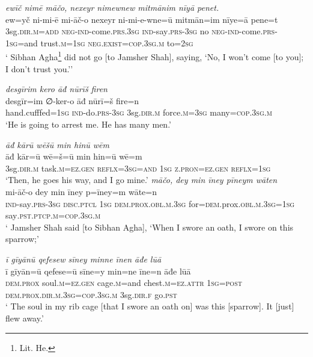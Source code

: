 \ea \label{DP.40}
\textit{ewīč nimē māčo, nexeyr nimewnew mitmānim nīyā penet.} \\ 
\gll ew=yč ni-mi-ē mi-āč-o nexeyr ni-mi-e-wne=ū mitmān=im nīye=ā pene=t \\ 
 3sg\textsc{.dir}\textsc{.m}\textsc{=add} \textsc{neg-}\textsc{ind-}come\textsc{.prs}\textsc{.3sg} \textsc{ind-}say\textsc{.prs}\textsc{-3sg} no \textsc{neg-}\textsc{ind-}come\textsc{.prs}\textsc{-1sg}=and trust\textsc{.m}\textsc{=1sg} \textsc{\textsc{neg.}exist}\textsc{=cop}\textsc{.3sg}\textsc{.m} to\textsc{=\textsc{2sg}} \\ 
\glt ` Sibhan Agha\footnote{Lit. He.} did not go [to Jamsher Shah], saying, ‘No, I won’t come [to you]; I don’t trust you.’'
\z 
 
\ea \label{DP.41}
\textit{desgīrim kero āđ nūrīš firen} \\ 
\gll desgīr=im ∅-ker-o āđ nūrī=š fire=n \\ 
 hand.cufffed\textsc{=1sg} \textsc{ind-}do\textsc{.prs}\textsc{-3sg} 3sg\textsc{.dir}\textsc{.m} force\textsc{.m}\textsc{=3sg} many\textsc{=cop}\textsc{.3sg}\textsc{.m} \\ 
\glt `He is going to arrest me. He has many men.'
\z 
 
\ea \label{DP.45}
\textit{āđ kārū wēšū min hinū wēm} \\ 
\gll āđ kār=ū wē=š=ū min hin=ū wē=m \\ 
 3sg\textsc{.dir}\textsc{.m} task\textsc{.m}\textsc{=ez}\textsc{.gen} \textsc{reflx}\textsc{=3sg}\textsc{=and} \textsc{1sg} \textsc{z.pron}\textsc{=ez}\textsc{.gen} \textsc{reflx}\textsc{=1sg} \\ 
\glt `Then, he goes his way, and I go mine.'
\z 
\ea \label{DP.48}
\textit{māčo, dey min īney pīneym wāten} \\ 
\gll mi-āč-o dey min īney p=īney=m wāte=n \\ 
 \textsc{ind-}say\textsc{.prs}\textsc{-3sg} \textsc{disc.ptcl} \textsc{1sg} \textsc{dem.prox}\textsc{.obl}\textsc{.m}\textsc{.3sg} for\textsc{=dem}.prox\textsc{.obl}\textsc{.m}\textsc{.3sg}\textsc{=1sg} say\textsc{.pst}\textsc{.ptcp}\textsc{.m}\textsc{=cop}\textsc{.3sg}\textsc{.m} \\ 
\glt ` Jamsher Shah said [to Sibhan Agha], ‘When I swore an oath, I swore on this sparrow;'
\z 
 
\ea \label{DP.49}
\textit{ī gīyānū qefesew sīney minne īnen āđe lūā} \\ 
\gll ī gīyān=ū qefese=ū sīne=y min=ne īne=n āđe lūā \\ 
 \textsc{dem.prox} soul\textsc{.m}\textsc{=ez}\textsc{.gen} cage\textsc{.m}=and chest\textsc{.m}\textsc{=ez}.\textsc{attr} \textsc{1sg}\textsc{=\textsc{post}} \textsc{dem.prox}\textsc{.dir}\textsc{.m}\textsc{.3sg}\textsc{=cop}\textsc{.3sg}\textsc{.m} 3sg\textsc{.dir}\textsc{\textsc{.f}} go\textsc{.pst} \\ 
\glt ` The soul in my rib cage [that I swore an oath on] was this [sparrow]. It [just] flew away.'
\z 
 
